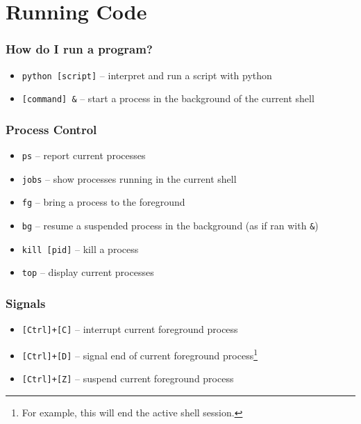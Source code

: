\documentclass[aspectratio=169]{beamer}
\begin{document}

\section{Running Code}

\frame{\sectionpage}

\begin{frame}
	\frametitle{How do I run a program?}
	\begin{itemize}
		\item \texttt{python [script]} -- interpret and run a script with python
		\item \texttt{[command] \&} -- start a process in the background of the current shell
	\end{itemize}
\end{frame}

\begin{frame}
	\frametitle{Process Control}
	\begin{itemize}
		\item \texttt{ps} -- report current processes
		\item \texttt{jobs} -- show processes running in the current shell
		\item \texttt{fg} -- bring a process to the foreground
		\item \texttt{bg} -- resume a suspended process in the background (as if ran with \texttt{\&})
		\item \texttt{kill [pid]} -- kill a process
		\item \texttt{top} -- display current processes
	\end{itemize}
\end{frame}

\begin{frame}
	\frametitle{Signals}
	\begin{itemize}
		\item \texttt{[Ctrl]+[C]} -- interrupt current foreground process
		\item \texttt{[Ctrl]+[D]} -- signal end of current foreground process\footnote{For example, this will end the active shell session.}
		\item \texttt{[Ctrl]+[Z]} -- suspend current foreground process
	\end{itemize}
\end{frame}

\end{document}
